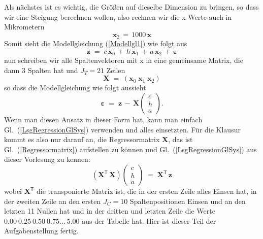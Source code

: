 Als nächstes ist es wichtig, die Größen auf dieselbe Dimension zu bringen,
so dass wir eine Steigung berechnen wollen, also rechnen wir die x-Werte auch in Mikrometern
$$
\boldsymbol x_2 \, = \, 1000 \, \boldsymbol x
$$
Somit sieht die Modellgleichung (\ref{Modellgl1}) wie folgt aus
$$
\boldsymbol z \; = \;  c \,  \boldsymbol x_0 \,  + \, h \, \boldsymbol x_1 \, + \, a \, \boldsymbol x_2 \, + \, \boldsymbol \varepsilon
$$
nun schreiben wir alle Spaltenvektoren mit x in eine gemeinsame Matrix, die dann 3 Spalten hat und $J_T = 21$ Zeilen
\begin{equation}
\boldsymbol X \; = \; \left(\boldsymbol x_0 \; \boldsymbol x_1 \; \boldsymbol x_2 \right)
\label{Regressormatrix}
\end{equation}
so dass die Modellgleichung wie folgt aussieht
$$
\boldsymbol \varepsilon  \; = \;  \boldsymbol z \, - \, \boldsymbol X
\left(\begin{array}{c}
c\\
h\\
a
\end{array}\right) .
$$
Wenn man diesen Ansatz in dieser Form hat, kann man einfach Gl.~(\ref{LsgRegressionGlSys})
verwenden und alles einsetzten.
Für die Klausur kommt es also nur darauf an, die Regressormatrix $\boldsymbol X$, das ist Gl.~(\ref{Regressormatrix})
aufstellen zu können und Gl.~(\ref{LsgRegressionGlSys}) aus dieser Vorlesung zu kennen:
\begin{equation}
\left( \mathbf{X}^\mathsf{T}  \, \mathbf{X} \right) \left(\begin{array}{c}
c\\
h\\
a
\end{array}\right) \; = \;
 \mathbf{X}^\mathsf{T} \, \mathbf{z}
\end{equation}
wobei $\boldsymbol X^\mathsf{T}$ die transponierte Matrix ist, die in der ersten Zeile alles Einsen hat, in der
zweiten Zeile an den ersten $J_C = 10$ Spaltenpositionen Einsen und an den letzten 11 Nullen hat und in der dritten
und letzten Zeile die Werte $0.00 ~ 0.25 ~ 0.50 ~ 0.75 \dots ~5.00$ aus der Tabelle hat.
Hier ist dieser Teil der Aufgabenstellung fertig.


